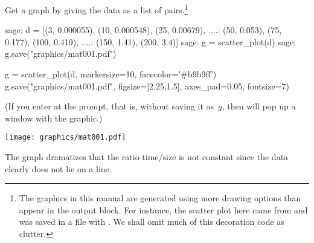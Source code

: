 Get a graph by giving \Sage{} the data as a list of pairs.\footnote{%
  The graphics in this manual are generated using 
  more drawing options than appear in the output block.
  For instance, the scatter plot here came from
  \protect{}
  and was saved in a file with
  \protect{}.
  We shall omit much of this decoration code as clutter.}
\begin{sagecommandline}
sage: d = [(3, 0.000055), (10, 0.000548), (25, 0.00679),  
....:      (50, 0.053), (75, 0.177), (100, 0.419), 
....:      (150, 1.41), (200, 3.4)]
sage: g = scatter_plot(d)  
sage: g.save("graphics/mat001.pdf")            
\end{sagecommandline}
\begin{sagesilent}
g = scatter_plot(d, markersize=10, facecolor='#b9b9ff')
g.save("graphics/mat001.pdf", figsize=[2.25,1.5], axes_pad=0.05, fontsize=7)
\end{sagesilent}
(If you enter  at the prompt, that is, 
without saving it as~$g$, then \Sage{} will pop up a window with the
graphic.)
\begin{center}
  \texttt{[image: graphics/mat001.pdf]}
\end{center}
The graph dramatizes that the ratio $\text{time}/\text{size}$
is not constant
since the data clearly does not lie on a line.

